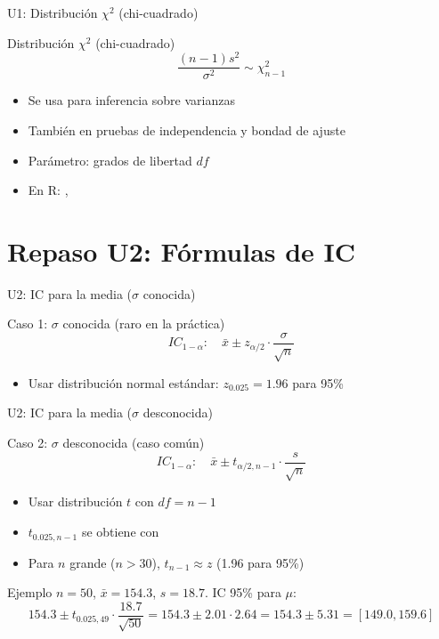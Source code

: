 \documentclass[aspectratio=169, 11pt]{beamer}
\begin{document}
\begin{frame}{U1: Distribución $\chi^2$ (chi-cuadrado)}
\begin{block}{Distribución $\chi^2$ (chi-cuadrado)}
$$\frac{(n-1)s^2}{\sigma^2} \sim \chi^2_{n-1}$$
\begin{itemize}
\item Se usa para inferencia sobre varianzas
\item También en pruebas de independencia y bondad de ajuste
\item Parámetro: grados de libertad $df$
\item En R: , 
\end{itemize}
\end{block}
\end{frame}

\section{Repaso U2: Fórmulas de IC}

\begin{frame}{U2: IC para la media ($\sigma$ conocida)}
\begin{block}{Caso 1: $\sigma$ conocida (raro en la práctica)}
$$IC_{1-\alpha}: \quad \bar{x} \pm z_{\alpha/2} \cdot \frac{\sigma}{\sqrt{n}}$$
\begin{itemize}
\item Usar distribución normal estándar: $z_{0.025} = 1.96$ para 95\%
\end{itemize}
\end{block}
\end{frame}

\begin{frame}{U2: IC para la media ($\sigma$ desconocida)}
\begin{block}{Caso 2: $\sigma$ desconocida (caso común)}
$$IC_{1-\alpha}: \quad \bar{x} \pm t_{\alpha/2, n-1} \cdot \frac{s}{\sqrt{n}}$$
\begin{itemize}
\item Usar distribución $t$ con $df = n - 1$
\item $t_{0.025, n-1}$ se obtiene con 
\item Para $n$ grande ($n > 30$), $t_{n-1} \approx z$ (1.96 para 95\%)
\end{itemize}
\end{block}

\begin{exampleblock}{Ejemplo}
\small
$n = 50$, $\bar{x} = 154.3$, $s = 18.7$. IC 95\% para $\mu$:
$$154.3 \pm t_{0.025, 49} \cdot \frac{18.7}{\sqrt{50}} = 154.3 \pm 2.01 \cdot 2.64 = 154.3 \pm 5.31 = [149.0, 159.6]$$
\end{exampleblock}
\end{frame}
\end{document}
